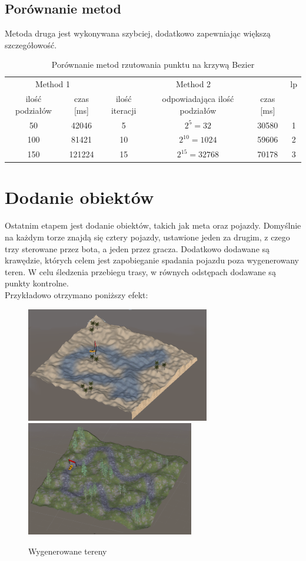 \subsection{Porównanie metod}
Metoda druga jest wykonywana szybciej, dodatkowo zapewniając większą szczegółowość.
\begin{table}[h]
    \centering
    \begin{tabular}{|c|c|c|c|c|c|}
        \hline
        \multicolumn{2}{|c|}{Method 1} & \multicolumn{3}{c|}{Method 2} & lp\\
        ilość podziałów & czas [ms] & ilość iteracji & odpowiadająca ilość podziałów & czas [ms] & \\
        \hline
        \hline
        50 & 42046 & 5 & $2^{5}=32$ & 30580 & 1 \\
        100 & 81421 & 10 & $2^{10}=1024$ & 59606 & 2 \\
        150 & 121224 & 15 & $2^{15}=32768$ & 70178 & 3 \\
        \hline
    \end{tabular}
    \caption{Porównanie metod rzutowania punktu na krzywą Bezier}
    \label{table}
\end{table}
\clearpage

\section{Dodanie obiektów}
Ostatnim etapem jest dodanie obiektów, takich jak meta oraz pojazdy. Domyślnie na każdym torze znajdą się cztery pojazdy, ustawione jeden za drugim, z czego trzy sterowane przez bota, a jeden przez gracza. Dodatkowo dodawane są krawędzie, których celem jest zapobieganie spadania pojazdu poza wygenerowany teren. W celu śledzenia przebiegu trasy, w równych odstępach dodawane są punkty kontrolne.\\
Przykładowo otrzymano poniższy efekt:
\begin{figure}[h]
        \centering
        \includegraphics[height=5cm]{figures/terrains_2.png}
    \endminipage\hfill
        \centering
        \includegraphics[height=5cm]{figures/terrains_1.png}
    \endminipage
    \caption{Wygenerowane tereny}
    \label{table}
\end{figure}